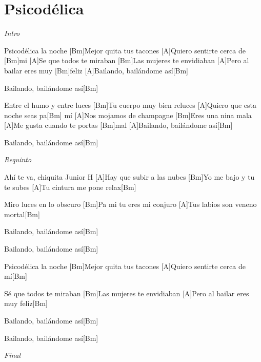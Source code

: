 \section{Psicod\'elica}

\noindent
\vspace{1cm}

\begin{guitar}
	\begin{multicols}{2}
		\textit{Intro} \par
		[A]Psicodélica la noche
		[Bm]Mejor quita tus tacones
		[A]Quiero sentirte cerca de [Bm]mi
		[A]Se que todos te miraban
		[Bm]Las mujeres te envidiaban
		[A]Pero al bailar eres muy [Bm]feliz
		[A]Bailando, bailándome así[Bm] \par
		[A]Bailando, bailándome así[Bm] \par
		[A]Entre el humo y entre luces
		[Bm]Tu cuerpo muy bien reluces
		[A]Quiero que esta noche seas pa[Bm] mí
		[A]Nos mojamos de champagne
		[Bm]Eres una nina mala
		[A]Me gusta cuando te portas [Bm]mal
		[A]Bailando, bailándome así[Bm] \par
		[Bm]Bailando, bailándome así[Bm] \par
		\par
		\textit{Requinto}

		Ahí te va, chiquita
		Junior H
		[A]Hay que subir a las nubes
		[Bm]Yo me bajo y tu te subes
		[A]Tu cintura me pone relax[Bm] \par
		[A]Miro luces en lo obscuro
		[Bm]Pa mi tu eres mi conjuro
		[A]Tus labios son veneno mortal[Bm] \par
		[A]Bailando, bailándome así[Bm] \par
		[A]Bailando, bailándome así[Bm] \par
		[A]Psicodélica la noche
		[Bm]Mejor quita tus tacones
		[A]Quiero sentirte cerca de mí[Bm] \par
		[A]Sé que todos te miraban
		[Bm]Las mujeres te envidiaban
		[A]Pero al bailar eres muy feliz[Bm] \par
		[A]Bailando, bailándome así[Bm] \par
		[A]Bailando, bailándome así[Bm] \par
		\par
		\textit{Final}
	\end{multicols}
\end{guitar}

